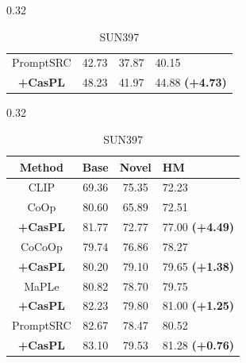 \documentclass[runningheads]{llncs}
\newcommand{\improve}[1]{\textcolor{boost_line}{\textbf{#1}}}
\begin{document}
{{\begin{table}[!t]
\begin{subtable}[t]{0.32\linewidth}
{\begin{tabular}{c|ccl}
            \hline
            PromptSRC & 42.73 & 37.87 & 40.15 \\
            \rowcolor{tablecolor} \textbf{+CasPL} &48.23 	&41.97 	&44.88   \improve{(+4.73)} \\
            \hline
        \end{tabular}
        }
        \caption{FGVCAircraft}
    \end{subtable}
    \begin{subtable}[t]{0.32\linewidth}
        \resizebox{0.96\linewidth}{!}
        {
        \begin{tabular}{c|ccl}
            \hline
            Method    & Base  & Novel & HM \\
            \hline
            CLIP & 69.36 & 75.35 & 72.23 \\
            \hline
            CoOp & 80.60 & 65.89 & 72.51 \\
            \rowcolor{tablecolor} \textbf{+CasPL} &81.77 	&72.77 	&77.00    \improve{(+4.49)}   \\
            \hline
            CoCoOp & 79.74 & 76.86 & 78.27 \\
            \rowcolor{tablecolor} \textbf{+CasPL} &80.20 	&79.10 	&79.65   \improve{(+1.38)}  \\
            \hline
            MaPLe & 80.82 & 78.70 & 79.75 \\
            \rowcolor{tablecolor} \textbf{+CasPL} &82.23 	&79.80 	&81.00  \improve{(+1.25)} \\
            \hline
            PromptSRC & 82.67 & 78.47 & 80.52 \\
            \rowcolor{tablecolor} \textbf{+CasPL} &83.10 	&79.53 	&81.28  \improve{(+0.76)}  \\
            \hline
        \end{tabular}
        }
        \caption{SUN397}
    \end{subtable}



\end{table}}}
\end{document}

